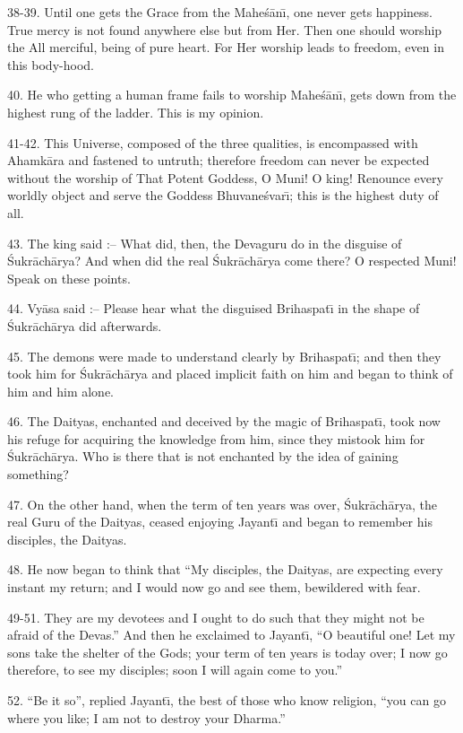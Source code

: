 38-39. Until one gets the Grace from the Mahe\'s\=an\={\i}, one never gets happiness. True mercy is not found anywhere else but from Her. Then one should worship the All merciful, being of pure heart. For Her worship leads to freedom, even in this body-hood.

40. He who getting a human frame fails to worship Mahe\'s\=an\={\i}, gets down from the highest rung of the ladder. This is my opinion.

41-42. This Universe, composed of the three qualities, is encompassed with Ahamk\=ara and fastened to untruth; therefore freedom can never be expected without the worship of That Potent Goddess, O Muni! O king! Renounce every worldly object and serve the Goddess Bhuvane\'svar\={\i}; this is the highest duty of all.

43. The king said :-- What did, then, the Devaguru do in the disguise of \'Sukr\=ach\=arya? And when did the real \'Sukr\=ach\=arya come there? O respected Muni! Speak on these points.

44. Vy\=asa said :-- Please hear what the disguised Brihaspat\={\i} in the shape of \'Sukr\=ach\=arya did afterwards.

45. The demons were made to understand clearly by Brihaspat\={\i}; and then they took him for \'Sukr\=ach\=arya and placed implicit faith on him and began to think of him and him alone.

46. The Daityas, enchanted and deceived by the magic of Brihaspat\={\i}, took now his refuge for acquiring the knowledge from him, since they mistook him for \'Sukr\=ach\=arya. Who is there that is not enchanted by the idea of gaining something?

47. On the other hand, when the term of ten years was over, \'Sukr\=ach\=arya, the real Guru of the Daityas, ceased enjoying Jayant\={\i} and began to remember his disciples, the Daityas.

48. He now began to think that ``My disciples, the Daityas, are expecting every instant my return; and I would now go and see them, bewildered with fear.

49-51. They are my devotees and I ought to do such that they might not be afraid of the Devas.'' And then he exclaimed to Jayant\={\i}, ``O beautiful one! Let my sons take the shelter of the Gods; your term of ten years is today over; I now go therefore, to see my disciples; soon I will again come to you.''

52. ``Be it so'', replied Jayant\={\i}, the best of those who know religion, ``you can go where you like; I am not to destroy your Dharma.''

